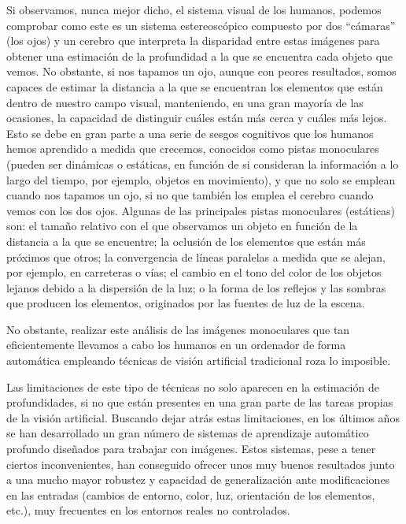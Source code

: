 Si observamos, nunca mejor dicho, el sistema visual de los humanos, podemos comprobar como este es un sistema estereoscópico compuesto por dos  ``cámaras''  (los ojos) y un cerebro que interpreta la disparidad entre estas imágenes para obtener una estimación de la profundidad a la que se encuentra cada objeto que vemos. No obstante, si nos tapamos un ojo, aunque con peores resultados, somos capaces de estimar la distancia a la que se encuentran los elementos que están dentro de nuestro campo visual, manteniendo, en una gran mayoría de las ocasiones, la capacidad de distinguir cuáles están más cerca y cuáles más lejos. Esto se debe en gran parte a una serie de sesgos cognitivos que los humanos hemos aprendido a medida que crecemos, conocidos como pistas monoculares (pueden ser dinámicas o estáticas, en función de si consideran la información a lo largo del tiempo, por ejemplo, objetos en movimiento), y que no solo se emplean cuando nos tapamos un ojo, si no que también los emplea el cerebro cuando vemos con los dos ojos. Algunas de las principales pistas monoculares (estáticas) \cite{Kalloniatis2005-pc} son: el tamaño relativo con el que observamos un objeto en función de la distancia a la que se encuentre; la oclusión de los elementos que están más próximos que otros; la convergencia de líneas paralelas a medida que se alejan, por ejemplo, en carreteras o vías; el cambio en el tono del color de los objetos lejanos debido a la dispersión de la luz; o la forma de los reflejos y las sombras que producen los elementos, originados por las fuentes de luz de la escena.

No obstante, realizar este análisis de las imágenes monoculares que tan eficientemente llevamos a cabo los humanos en un ordenador de forma automática empleando técnicas de visión artificial tradicional roza lo imposible. 

Las limitaciones de este tipo de técnicas no solo aparecen en la estimación de profundidades, si no que están presentes en una gran parte de las tareas propias de la visión artificial. Buscando dejar atrás estas limitaciones, en los últimos años se han desarrollado un gran número de sistemas de aprendizaje automático profundo diseñados para trabajar con imágenes. Estos sistemas, pese a tener ciertos inconvenientes, han conseguido ofrecer unos muy buenos resultados junto a una mucho mayor robustez y capacidad de generalización ante modificaciones en las entradas (cambios de entorno, color, luz, orientación de los elementos, etc.), muy frecuentes en los entornos reales no controlados.

